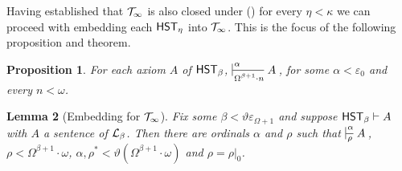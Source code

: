 \documentclass[UKenglish,cleveref,DIV=12]{scrartcl}
\newtheorem{lemma}{Lemma}[section]
\newtheorem{proposition}[lemma]{Proposition}
\theoremstyle{definition}
\theoremstyle{definition}
\begin{document}
Having established that $\mathcal{T}_\infty$ is also closed under (\Conec\eta) for every
$\eta<\kappa$ we can proceed with embedding each $\mathsf{HST}_\eta$ into $\mathcal{T}_\infty$. This
is the focus of the following proposition and theorem.
\begin{proposition}\label{prop:T8embed}
 For each axiom $A$ of $\mathsf{HST}_\beta$, $\prov\alpha{\Omega^{\beta+1}\cdot n}A$, for some $\alpha<\varepsilon_0$ and every $n<\omega$.
\end{proposition}
%
\begin{lemma}[Embedding  for $\mathcal{T}_\infty$]\label{thm:T8Embed}
Fix some $\beta<\vartheta\varepsilon_{\Omega+1}$ and suppose $\mathsf{HST}_\beta\vdash A$ with $A$ a sentence of $\mathcal{L}_\beta$. Then there are ordinals $\alpha$ and $\rho$ such that $\prov\alpha\rho A$, $\rho<\Omega^{\beta+1}\cdot \omega$,  $\alpha,\rho^*<\vartheta(\Omega^{\beta+1}\cdot \omega)$ and $\rho=\rho|_0$.
\end{lemma}
\end{document}
